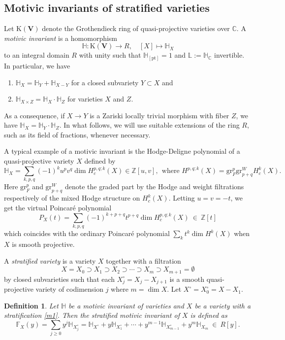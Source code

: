 \documentclass[11pt]{amsart}
\newtheorem{definition}[theorem]{Definition}
\def\ZZ{\mathbb{Z}}
\def\CC{\mathbb{C}}
\def\LL{\mathbb{L}}
\def\lra{\longrightarrow}
\def\beq{\begin{equation}}
\def\eeq{\end{equation}}
\def\HH{\mathbb{H}}
\def\FF{\mathbb{F}}
\def\KV{\mathrm{K}(\mathbf{V}) }
\begin{document}
\subsection{Motivic invariants of stratified varieties}
Let $\KV$ denote the Grothendieck ring of quasi-projective varieties over $\CC$. A \emph{motivic invariant} is a homomorphism 
$$\HH:\KV\lra R,\quad [X]\mapsto \HH_X$$
to an integral domain $R$ with unity such that $\HH_{[\mathrm{pt}]}=1$ and $\LL:=\HH_\CC$ invertible. 
In particular, we have 
\begin{enumerate}
    \item $\HH_X=\HH_Y+\HH_{X-Y}$ for a closed subvariety $Y\subset X$ and 
    \item $\HH_{X\times Z}=\HH_X \cdot \HH_Z$ for varieties $X$ and $Z$. 
\end{enumerate} 
As a consequence, if $X\to Y$ is a Zariski locally trivial morphism with fiber $Z$, we have $\HH_X=\HH_Y\cdot \HH_Z$. 
In what follows, we will use suitable extensions of the ring $R$, such as its field of fractions, whenever necessary.


A typical example of a motivic invariant is 
the Hodge-Deligne polynomial of a quasi-projective variety $X$ defined by  
$$\HH_X=\sum_{k,p,q}(-1)^ku^{p}v^q\dim H^{p,q;k}_c(X) \in \ZZ[u,v],\ \ \text{where } H^{p,q;k}(X)=\mathrm{gr}^p_F\mathrm{gr}^W_{p+q}H^k_c(X).$$
Here $\mathrm{gr}^p_F$ and $\mathrm{gr}^W_{p+q}$ denote the graded part by the Hodge and weight filtrations respectively of the mixed Hodge structure on $H^k_c(X)$. Letting $u=v=-t$, we get the virtual Poincar\'e polynomial 
$$P_X(t)=\sum_{k,p,q}(-1)^{k+p+q}t^{p+q}\dim H^{p,q;k}_c(X)\ \in \ \ZZ[t]$$
which coincides with the ordinary Poincar\'e polynomial $\sum_kt^k\dim H^k(X)$ when $X$ is smooth projective. 

\medskip

A \emph{stratified variety} is a variety $X$ together with a filtration
\beq\label{m1}
X=X_0\supset X_1\supset X_2\supset \cdots \supset X_{m}\supset X_{m+1}=\emptyset
\eeq
by closed subvarieties such that each $X_j^\circ=X_j-X_{j+1}$ is a smooth quasi-projective variety of codimension $j$ where $m=\dim X$. Let $X^\circ=X_0^\circ=X-X_1$.

\begin{definition}
    Let $\HH$ be a motivic invariant of varieties and $X$ be a variety with a  stratification \eqref{m1}. Then the \emph{stratified motivic invariant} of $X$ is defined as
    \beq\label{m2} \FF_{X}(y) =\sum_{j\ge 0} y^j \HH_{X_j^\circ} =\HH_{X^\circ}+y\HH_{X_1^\circ}+\cdots+y^{m-1}\HH_{X_{m-1}^\circ}+y^m\HH_{X_m}\ \in \ R[y].\eeq
\end{definition}
\end{document}
